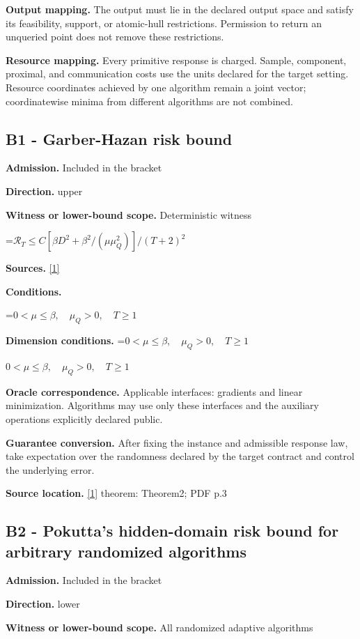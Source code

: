 \documentclass[10pt,a4paper]{article}
\newcommand{\AtlasMath}[1]{\par\begingroup\centering\setbox0=\hbox{$\displaystyle #1$}\ifdim\wd0>1.4\linewidth\typeout{ATLAS WIDE FORMULA: \the\wd0}\fi\ifdim\wd0>\linewidth\resizebox{\linewidth}{!}{\box0}\else\box0\fi\par\endgroup}
\newcommand{\AtlasInlineMath}[1]{\begingroup\setbox0=\hbox{$#1$}\ifdim\wd0>.4\linewidth\endgroup\AtlasMath{#1}\else\endgroup$#1$\fi}
\begin{document}
\textbf{Output mapping.} The output must lie in the declared output space and satisfy its feasibility, support, or atomic-hull restrictions. Permission to return an unqueried point does not remove these restrictions.

\textbf{Resource mapping.} Every primitive response is charged. Sample, component, proximal, and communication costs use the units declared for the target setting. Resource coordinates achieved by one algorithm remain a joint vector; coordinatewise minima from different algorithms are not combined.

\subsection{B1 - Garber-Hazan risk bound}
\textbf{Admission.} Included in the bracket

\textbf{Direction.} upper

\textbf{Witness or lower-bound scope.} Deterministic witness

\AtlasMath{\mathcal{R}_T\le C[\beta D^2+\beta^2/(\mu\mu_Q^2)]/(T+2)^2}
\textbf{Sources.} \href{https://proceedings.mlr.press/v37/garbera15.pdf}{[1]}

\textbf{Conditions.} 
\AtlasMath{0<\mu\le\beta,\quad\mu_Q>0,\quad T\ge1}


\textbf{Dimension conditions.} \AtlasInlineMath{0<\mu\le\beta,\quad\mu_Q>0,\quad T\ge1}

\textbf{Oracle correspondence.} Applicable interfaces: gradients and linear minimization. Algorithms may use only these interfaces and the auxiliary operations explicitly declared public.

\textbf{Guarantee conversion.} After fixing the instance and admissible response law, take expectation over the randomness declared by the target contract and control the underlying error.

\textbf{Source location.} \href{https://proceedings.mlr.press/v37/garbera15.pdf}{[1]} theorem: Theorem2; PDF p.3

\subsection{B2 - Pokutta's hidden-domain risk bound for arbitrary randomized algorithms}
\textbf{Admission.} Included in the bracket

\textbf{Direction.} lower

\textbf{Witness or lower-bound scope.} All randomized adaptive algorithms
\end{document}
